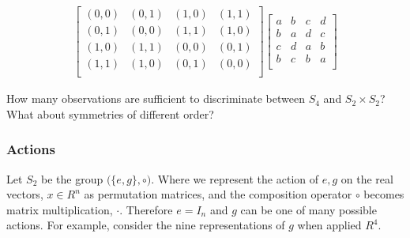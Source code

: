  \begin{align*}
  \begin{bmatrix}
    (0, 0) & (0, 1) & (1, 0) & (1, 1) \\
    (0, 1) & (0, 0) & (1, 1) & (1, 0) \\
    (1, 0) & (1, 1) & (0, 0) & (0, 1) \\
    (1, 1) & (1, 0) & (0, 1) & (0, 0) \\
  \end{bmatrix}
 \begin{bmatrix}
   a & b & c & d \\
   b & a & d & c \\
   c & d & a & b \\
   b & c & b & a \\
 \end{bmatrix}
 \end{align*}


How many observations are sufficient to discriminate between $S_4$ and $S_2\times S_2$?
What about symmetries of different order?

\subsubsection{Actions}

Let $S_2$ be the group $\big(\{e, g\}, \circ \big)$. Where we represent the action of $e, g$ on the real vectors, $x\in R^n$
as permutation matrices, and the composition operator $\circ$ becomes matrix multiplication, $\cdot$. Therefore $e = I_n$ and $g$ can be one of many possible actions. For example, consider the nine \footnotemark[34] representations of $g$ when applied $R^4$.


